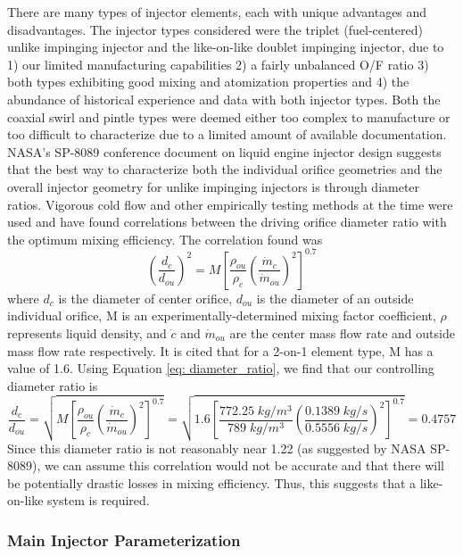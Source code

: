 \documentclass[9pt]{article} %
\numberwithin{equation}{section} %
\begin{document}
There are many types of injector elements, each with unique advantages and disadvantages. The injector types considered were the triplet (fuel-centered) unlike impinging injector and the like-on-like doublet impinging injector, due to 1) our limited manufacturing capabilities 2) a fairly unbalanced O/F ratio 3) both types exhibiting good mixing and atomization properties and 4) the abundance of historical experience and data with both injector types. Both the coaxial swirl and pintle types were deemed either too complex to manufacture or too difficult to characterize due to a limited amount of available documentation. NASA's SP-8089 conference document on liquid engine injector design suggests that the best way to characterize both the individual orifice geometries and the overall injector geometry for unlike impinging injectors is through diameter ratios. Vigorous cold flow and other empirically testing methods at the time were used and have found correlations between the driving orifice diameter ratio with the optimum mixing efficiency. The correlation found was
\begin{equation} \label{eq: diameter_ratio}
    \left( \frac{d_{c}}{d_{ou}} \right)^{2} = M \left[ \frac{\rho_{ou}}{\rho_{c}} \left( \frac{\dot{m}_{c}}{\dot{m}_{ou}} \right)^{2} \right]^{0.7}
\end{equation}
where $d_{c}$ is the diameter of center orifice, $d_{ou}$ is the diameter of an outside individual orifice, M is an experimentally-determined mixing factor coefficient, $\rho$ represents liquid density, and $\dot{c}$ and $\dot{m}_{ou}$ are the center mass flow rate and outside mass flow rate respectively. It is cited that for a 2-on-1 element type, M has a value of 1.6. Using Equation \ref{eq: diameter_ratio}, we find that our controlling diameter ratio is
\begin{equation*}
    \frac{d_{c}}{d_{ou}} = \sqrt{M \left[ \frac{\rho_{ou}}{\rho_{c}} \left( \frac{\dot{m}_{c}}{\dot{m}_{ou}} \right)^{2} \right]^{0.7}} = \sqrt{1.6 \left[ \frac{772.25 \; kg/m^{3}}{789 \; kg/m^{3}} \left( \frac{0.1389 \; kg/s}{0.5556 \; kg/s} \right)^{2} \right]^{0.7}} = 0.4757
\end{equation*}
Since this diameter ratio is not reasonably near 1.22 (as suggested by NASA SP-8089), we can assume this correlation would not be accurate and that there will be potentially drastic losses in mixing efficiency. Thus, this suggests that a like-on-like system is required. 

\subsubsection{Main Injector Parameterization}
\end{document}
